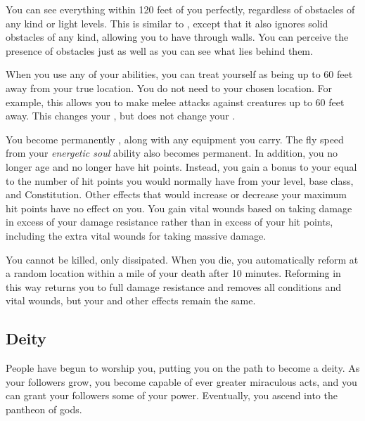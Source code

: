        You can see everything within 120 feet of you perfectly, regardless of obstacles of any kind or light levels.
      This is similar to , except that it also ignores solid obstacles of any kind, allowing you to have  through walls.
      You can perceive the presence of obstacles just as well as you can see what lies behind them.

       When you use any of your abilities, you can treat yourself as being up to 60 feet away from your true location.
      You do not need  to your chosen location.
      For example, this allows you to make melee attacks against creatures up to 60 feet away.
      This changes your , but does not change your .

       You become permanently , along with any equipment you carry.
      The fly speed from your \textit{energetic soul} ability also becomes permanent.
      In addition, you no longer age and no longer have hit points.
      Instead, you gain a bonus to your  equal to the number of hit points you would normally have from your level, base class, and Constitution.
      Other effects that would increase or decrease your maximum hit points have no effect on you.
      You gain vital wounds based on taking damage in excess of your damage resistance rather than in excess of your hit points, including the extra vital wounds for taking massive damage.

       You cannot be killed, only dissipated.
      When you die, you automatically reform at a random location within a mile of your death after 10 minutes.
      Reforming in this way returns you to full damage resistance and removes all conditions and vital wounds, but your  and other effects remain the same.

  \subsection{Deity}
    People have begun to worship you, putting you on the path to become a deity.
    As your followers grow, you become capable of ever greater miraculous acts, and you can grant your followers some of your power.
    Eventually, you ascend into the pantheon of gods.

